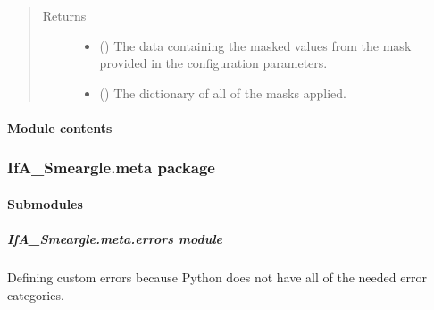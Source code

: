 \documentclass[letterpaper,10pt,english]{sphinxmanual}
\begin{document}
\begin{fulllineitems}
\begin{quote}
\begin{description}
\begin{itemize}
\end{itemize}

\item[{Returns}] \leavevmode
\begin{itemize}
\item {} 
 () \textendash{} The data containing the masked values from the mask provided in the
configuration parameters.

\item {} 
 () \textendash{} The dictionary of all of the masks applied.

\end{itemize}


\end{description}\end{quote}

\end{fulllineitems}



\paragraph{Module contents}
\label{\detokenize{python_docstrings/IfA_Smeargle.echo:module-IfA_Smeargle.echo}}\label{\detokenize{python_docstrings/IfA_Smeargle.echo:module-contents}}

\subsubsection{IfA\_Smeargle.meta package}
\label{\detokenize{python_docstrings/IfA_Smeargle.meta:ifa-smeargle-meta-package}}\label{\detokenize{python_docstrings/IfA_Smeargle.meta::doc}}

\paragraph{Submodules}
\label{\detokenize{python_docstrings/IfA_Smeargle.meta:submodules}}

\subparagraph{IfA\_Smeargle.meta.errors module}
\label{\detokenize{python_docstrings/IfA_Smeargle.meta.errors:module-IfA_Smeargle.meta.errors}}\label{\detokenize{python_docstrings/IfA_Smeargle.meta.errors:ifa-smeargle-meta-errors-module}}\label{\detokenize{python_docstrings/IfA_Smeargle.meta.errors::doc}}
Defining custom errors because Python does not have all of the needed error
categories.
\end{document}
